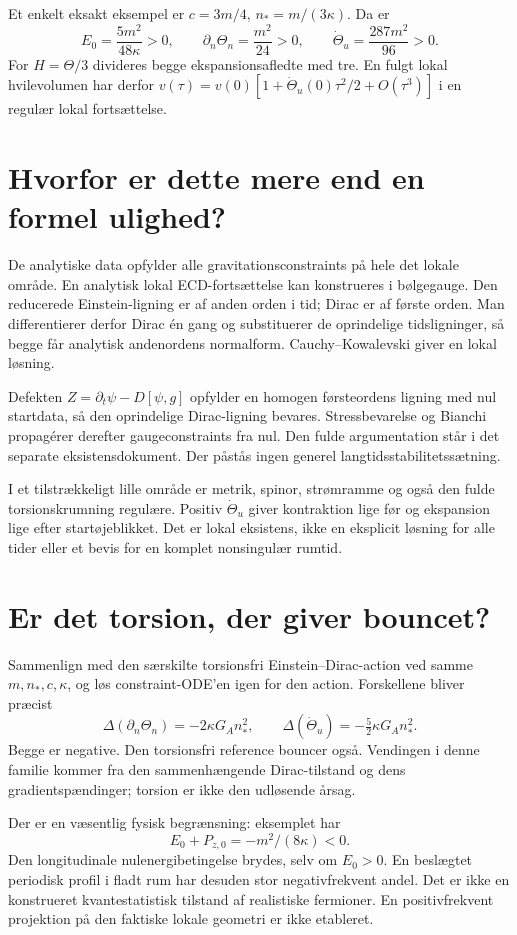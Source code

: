\documentclass[11pt,a4paper]{article}
\begin{document}
Et enkelt eksakt eksempel er $c=3m/4$, $n_*=m/(3\kappa)$. Da er
\[
 E_0=\frac{5m^2}{48\kappa}>0,\qquad
 \partial_n\Theta_n=\frac{m^2}{24}>0,\qquad
 \dot\Theta_u=\frac{287m^2}{96}>0.
\]
For $H=\Theta/3$ divideres begge ekspansionsafledte med tre. En fulgt lokal hvilevolumen har derfor $v(\tau)=v(0)[1+\dot\Theta_u(0)\tau^2/2+O(\tau^3)]$ i en regulær lokal fortsættelse.

\section{Hvorfor er dette mere end en formel ulighed?}
De analytiske data opfylder alle gravitationsconstraints på hele det lokale område. En analytisk lokal ECD-fortsættelse kan konstrueres i bølgegauge. Den reducerede Einstein-ligning er af anden orden i tid; Dirac er af første orden. Man differentierer derfor Dirac én gang og substituerer de oprindelige tidsligninger, så begge får analytisk andenordens normalform. Cauchy--Kowalevski giver en lokal løsning.

Defekten $Z=\partial_t\psi-D[\psi,g]$ opfylder en homogen førsteordens ligning med nul startdata, så den oprindelige Dirac-ligning bevares. Stressbevarelse og Bianchi propagérer derefter gaugeconstraints fra nul. Den fulde argumentation står i det separate eksistensdokument. Der påstås ingen generel langtidsstabilitetssætning.

I et tilstrækkeligt lille område er metrik, spinor, strømramme og også den fulde torsionskrumning regulære. Positiv $\dot\Theta_u$ giver kontraktion lige før og ekspansion lige efter startøjeblikket. Det er lokal eksistens, ikke en eksplicit løsning for alle tider eller et bevis for en komplet nonsingulær rumtid.

\section{Er det torsion, der giver bouncet?}
Sammenlign med den særskilte torsionsfri Einstein--Dirac-action ved samme $m,n_*,c,\kappa$, og løs constraint-ODE'en igen for den action. Forskellene bliver præcist
\[
 \Delta(\partial_n\Theta_n)=-2\kappa G_A n_*^2,\qquad
 \Delta(\dot\Theta_u)=-\tfrac52\kappa G_A n_*^2.
\]
Begge er negative. Den torsionsfri reference bouncer også. Vendingen i denne familie kommer fra den sammenhængende Dirac-tilstand og dens gradientspændinger; torsion er ikke den udløsende årsag.

Der er en væsentlig fysisk begrænsning: eksemplet har
\[
 E_0+P_{z,0}=-m^2/(8\kappa)<0.
\]
Den longitudinale nulenergibetingelse brydes, selv om $E_0>0$. En beslægtet periodisk profil i fladt rum har desuden stor negativfrekvent andel. Det er ikke en konstrueret kvantestatistisk tilstand af realistiske fermioner. En positivfrekvent projektion på den faktiske lokale geometri er ikke etableret.
\end{document}
